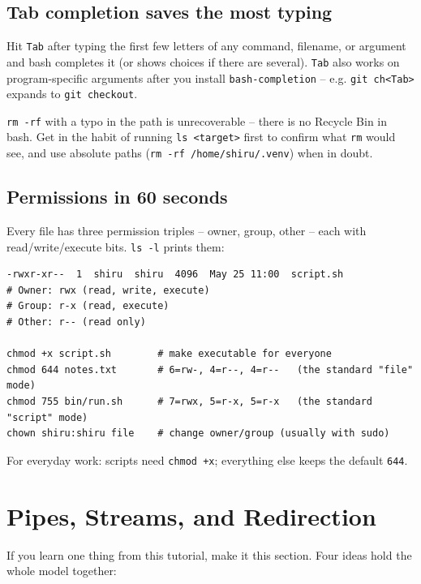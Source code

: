 \documentclass[11pt,a4paper]{article}
\begin{document}
\subsection*{Tab completion saves the most typing}

Hit \texttt{Tab} after typing the first few letters of any
command, filename, or argument and bash completes it (or shows
choices if there are several). \texttt{Tab} also works on
program-specific arguments after you install
\texttt{bash-completion} -- e.g. \texttt{git ch<Tab>} expands to
\texttt{git checkout}.

\begin{gotcha}
\texttt{rm -rf} with a typo in the path is unrecoverable -- there is
no Recycle Bin in bash. Get in the habit of running \texttt{ls
<target>} first to confirm what \texttt{rm} would see, and use
absolute paths (\texttt{rm -rf /home/shiru/.venv}) when in doubt.
\end{gotcha}

\subsection*{Permissions in 60 seconds}

Every file has three permission triples -- owner, group, other --
each with read/write/execute bits. \texttt{ls -l} prints them:

\begin{lstlisting}[style=bashstyle]
-rwxr-xr--  1  shiru  shiru  4096  May 25 11:00  script.sh
# Owner: rwx (read, write, execute)
# Group: r-x (read, execute)
# Other: r-- (read only)

chmod +x script.sh        # make executable for everyone
chmod 644 notes.txt       # 6=rw-, 4=r--, 4=r--   (the standard "file" mode)
chmod 755 bin/run.sh      # 7=rwx, 5=r-x, 5=r-x   (the standard "script" mode)
chown shiru:shiru file    # change owner/group (usually with sudo)
\end{lstlisting}

For everyday work: scripts need \texttt{chmod +x}; everything else
keeps the default \texttt{644}.

\section{Pipes, Streams, and Redirection}

If you learn one thing from this tutorial, make it this section.
Four ideas hold the whole model together:
\end{document}

